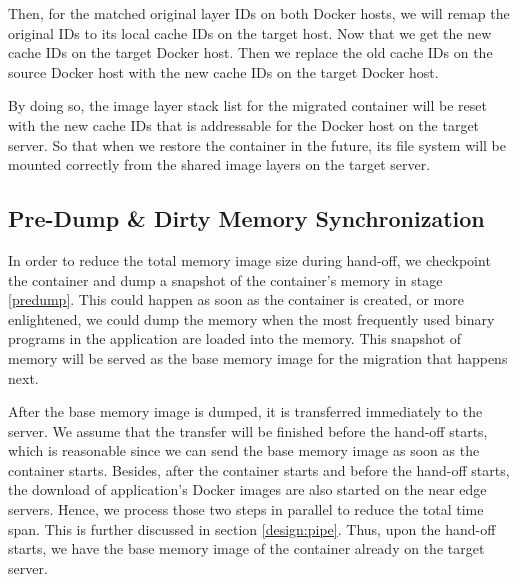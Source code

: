 Then, for the matched original layer IDs on both Docker hosts, we will remap the original IDs to its local cache IDs on the target host. Now that we get the new cache IDs on the target Docker host. Then we replace the old cache IDs on the source Docker host with the new cache IDs on the target Docker host.  

By doing so, the image layer stack list for the migrated container will be reset with the new cache IDs that is addressable for the Docker host on the target server. So that when we restore the container in the future, its file system will be mounted correctly from the shared image layers on the target server.






\subsection{Pre-Dump \& Dirty Memory Synchronization} \label{design:memDiff}

In order to reduce the total memory image size during hand-off, we checkpoint the container and dump a snapshot of the container's memory in stage \ref{predump}. This could happen as soon as the container is created, or more enlightened, we could dump the memory when the most frequently used binary programs in the application are loaded into the memory. This snapshot of memory will be served as the base memory image for the migration that happens next.

After the base memory image is dumped, it is transferred immediately to the server. We assume that the transfer will be finished before the hand-off starts, which is reasonable since we can send the base memory image as soon as the container starts. 
Besides, after the container starts and before the hand-off starts, the download of application's Docker images are also started on the near edge servers. 
Hence, we process those two steps in parallel to reduce the total time span. This is further discussed in section \ref{design:pipe}. Thus, upon the hand-off starts, we have the base memory image of the container already on the target server. 

